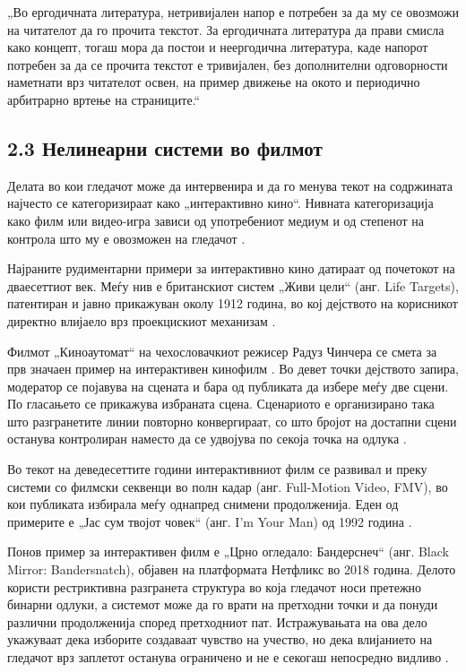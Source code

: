 „Во ергодичната литература, нетривијален напор е потребен за да му се овозможи на читателот да го прочита текстот. За ергодичната литература да прави смисла како концепт, тогаш мора да постои и неергодична литература, каде напорот потребен за да се прочита текстот е тривијален, без дополнителни одговорности наметнати врз читателот освен, на пример движење на окото и периодично арбитрарно вртење на страниците.“


\subsection{2.3 Нелинеарни системи во филмот}

Делата во кои гледачот може да интервенира и да го менува текот на содржината најчесто се категоризираат како „интерактивно кино“. Нивната категоризација како филм или видео-игра зависи од употребениот медиум и од степенот на контрола што му е овозможен на гледачот \cite{ref7}.

Најраните рудиментарни примери за интерактивно кино датираат од почетокот на дваесеттиот век. Меѓу нив е британскиот систем „Живи цели“ (анг. Life Targets), патентиран и јавно прикажуван околу 1912 година, во кој дејството на корисникот директно влијаело врз проекцискиот механизам \cite{ref6}.

Филмот „Киноаутомат“ на чехословачкиот режисер Радуз Чинчера се смета за прв значаен пример на интерактивен кинофилм \cite{ref8}. Во девет точки дејството запира, модератор се појавува на сцената и бара од публиката да избере меѓу две сцени. По гласањето се прикажува избраната сцена. Сценариото е организирано така што разгранетите линии повторно конвергираат, со што бројот на достапни сцени останува контролиран наместо да се удвојува по секоја точка на одлука \cite{ref8}.


Во текот на деведесеттите години интерактивниот филм се развивал и преку системи со филмски секвенци во полн кадар (анг. Full-Motion Video, FMV), во кои публиката избирала меѓу однапред снимени продолженија. Еден од примерите е „Јас сум твојот човек“ (анг. I’m Your Man) од 1992 година \cite{ref7}.

Понов пример за интерактивен филм е „Црно огледало: Бандерснеч“ (анг. Black Mirror: Bandersnatch), објавен на платформата Нетфликс во 2018 година. Делото користи рестриктивна разгранета структура во која гледачот носи претежно бинарни одлуки, а системот може да го врати на претходни точки и да понуди различни продолженија според претходниот пат. Истражувањата на ова дело укажуваат дека изборите создаваат чувство на учество, но дека влијанието на гледачот врз заплетот останува ограничено и не е секогаш непосредно видливо \cite{ref13}.


